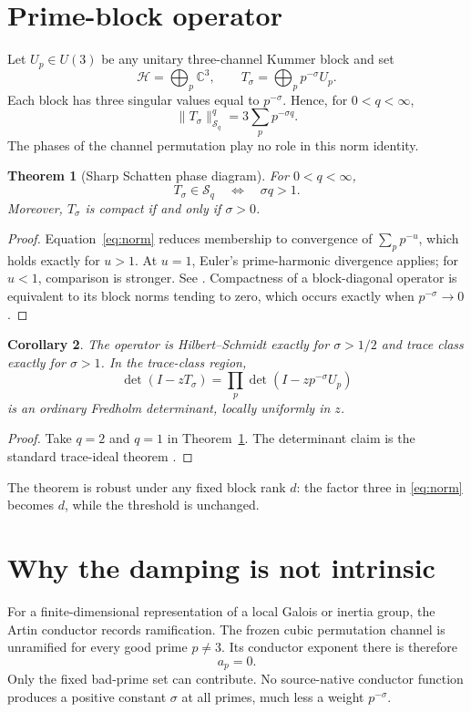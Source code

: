 \documentclass[11pt]{article}
\newtheorem{theorem}{Theorem}[section]
\newtheorem{corollary}[theorem]{Corollary}
\theoremstyle{remark}\newtheorem{remark}[theorem]{Remark}
\begin{document}
\section{Prime-block operator}
Let \(U_p\in U(3)\) be any unitary three-channel Kummer block and set
\[
 \mathcal H=\bigoplus_p\mathbb C^3,
 \qquad T_\sigma=\bigoplus_p p^{-\sigma}U_p.
\]
Each block has three singular values equal to \(p^{-\sigma}\).  Hence, for
\(0<q<\infty\),
\begin{equation}\label{eq:norm}
 \|T_\sigma\|_{\mathcal S_q}^q
 =3\sum_p p^{-\sigma q}.
\end{equation}
The phases of the channel permutation play no role in this norm identity.

\begin{theorem}[Sharp Schatten phase diagram]\label{thm:phase}
For \(0<q<\infty\),
\[
 T_\sigma\in\mathcal S_q
 \quad\Longleftrightarrow\quad \sigma q>1.
\]
Moreover, \(T_\sigma\) is compact if and only if \(\sigma>0\).
\end{theorem}
\begin{proof}
Equation~\eqref{eq:norm} reduces membership to convergence of
\(\sum_p p^{-u}\), which holds exactly for \(u>1\).  At \(u=1\), Euler's
prime-harmonic divergence applies; for \(u<1\), comparison is stronger.  See
\cite{Apostol1976}.  Compactness of a block-diagonal operator is equivalent
to its block norms tending to zero, which occurs exactly when
\(p^{-\sigma}\to0\).
\end{proof}

\begin{corollary}
The operator is Hilbert--Schmidt exactly for \(\sigma>1/2\) and trace class
exactly for \(\sigma>1\).  In the trace-class region,
\[
 \det(I-zT_\sigma)=\prod_p\det(I-zp^{-\sigma}U_p)
\]
is an ordinary Fredholm determinant, locally uniformly in \(z\).
\end{corollary}
\begin{proof}
Take \(q=2\) and \(q=1\) in Theorem~\ref{thm:phase}.  The determinant claim
is the standard trace-ideal theorem \cite{Simon2005}.
\end{proof}

The theorem is robust under any fixed block rank \(d\): the factor three in
\eqref{eq:norm} becomes \(d\), while the threshold is unchanged.

\section{Why the damping is not intrinsic}
For a finite-dimensional representation of a local Galois or inertia group,
the Artin conductor records ramification.  The frozen cubic permutation
channel is unramified for every good prime \(p\ne3\).  Its conductor exponent
there is therefore
\[
 a_p=0.
\]
Only the fixed bad-prime set can contribute.  No source-native conductor
function produces a positive constant \(\sigma\) at all primes, much less a
weight \(p^{-\sigma}\).
\end{document}
